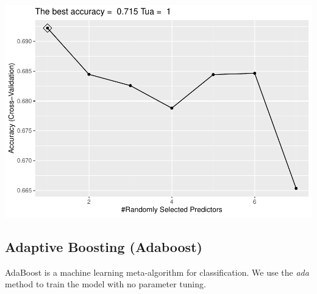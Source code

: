 \documentclass[]{article}
\newenvironment{Shaded}{\begin{snugshade}}{\end{snugshade}}
\newcommand{\CommentTok}[1]{\textcolor[rgb]{0.56,0.35,0.01}{\textit{#1}}}
\newcommand{\DataTypeTok}[1]{\textcolor[rgb]{0.13,0.29,0.53}{#1}}
\newcommand{\KeywordTok}[1]{\textcolor[rgb]{0.13,0.29,0.53}{\textbf{#1}}}
\newcommand{\NormalTok}[1]{#1}
\newcommand{\OperatorTok}[1]{\textcolor[rgb]{0.81,0.36,0.00}{\textbf{#1}}}
\newcommand{\StringTok}[1]{\textcolor[rgb]{0.31,0.60,0.02}{#1}}
\begin{document}
\includegraphics{LiverDisease_files/figure-latex/unnamed-chunk-33-1.pdf}

\begin{Shaded}
\end{Shaded}

\subsection{Adaptive Boosting (Adaboost)}

AdaBoost is a machine learning meta-algorithm for classification. We use
the \emph{ada} method to train the model with no parameter tuning.
\end{document}
